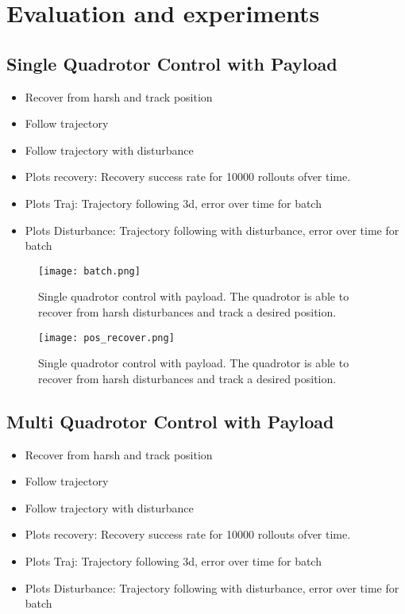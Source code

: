 \chapter{Evaluation and experiments}
\section{Single Quadrotor Control with Payload}
\begin{itemize}
    \item Recover from harsh and track position
    \item Follow trajectory
    \item Follow trajectory with disturbance
    \item Plots recovery: Recovery success rate for 10000 rollouts ofver time.
    \item Plots Traj: Trajectory following 3d, error over time for batch
    \item Plots Disturbance: Trajectory following with disturbance, error over time for batch

\end{itemize}
\begin{figure}
    \centering
    \texttt{[image: batch.png]}
    \caption{Single quadrotor control with payload. The quadrotor is able to recover from harsh disturbances and track a desired position.}
    \label{fig:single_quadrotor_control}
\end{figure}
\begin{figure}
    \centering
    \texttt{[image: pos\_recover.png]}
    \caption{Single quadrotor control with payload. The quadrotor is able to recover from harsh disturbances and track a desired position.}
    \label{fig:single_quadrotor_control}
\end{figure}
\section{Multi Quadrotor Control with Payload}
\begin{itemize}
    \item Recover from harsh and track position
    \item Follow trajectory
    \item Follow trajectory with disturbance
    \item Plots recovery: Recovery success rate for 10000 rollouts ofver time.
    \item Plots Traj: Trajectory following 3d, error over time for batch
    \item Plots Disturbance: Trajectory following with disturbance, error over time for batch
\end{itemize}

